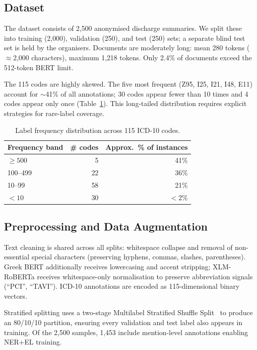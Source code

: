 \subsection{Dataset}

The dataset consists of 2,500 anonymised discharge summaries. We split these into
training (2,000), validation (250), and test (250) sets; a separate blind test set is
held by the organisers. Documents are moderately long: mean 280 tokens ($\approx$2,000 characters),
maximum 1,218 tokens. Only 2.4\% of documents exceed the 512-token BERT limit.

The 115 codes are highly skewed. The five most frequent (Z95, I25, I21, I48, E11)
account for $\sim$41\% of all annotations; 30 codes appear fewer than 10 times and 4
codes appear only once (Table~\ref{tab:label_stats}). This long-tailed distribution
requires explicit strategies for rare-label coverage.

\begin{table}[ht]
\centering
\caption{Label frequency distribution across 115 ICD-10 codes.}
\label{tab:label_stats}
\begin{tabular}{lrr}
\toprule
Frequency band & \# codes & Approx.\ \% of instances \\
\midrule
$\geq 500$  & 5  & 41\% \\
100--499    & 22 & 36\% \\
10--99      & 58 & 21\% \\
$< 10$      & 30 & $<$2\% \\
\bottomrule
\end{tabular}
\end{table}

\subsection{Preprocessing and Data Augmentation}

Text cleaning is shared across all splits: whitespace collapse and removal of non-essential
special characters (preserving hyphens, commas, slashes, parentheses). Greek BERT
additionally receives lowercasing and accent stripping; XLM-RoBERTa receives
whitespace-only normalisation to preserve abbreviation signals (``PCI'', ``TAVI'').
ICD-10 annotations are encoded as 115-dimensional binary vectors.

Stratified splitting uses a two-stage Multilabel Stratified Shuffle Split~\cite{sechidis2011stratification}
to produce an 80/10/10 partition, ensuring every validation and test label also appears
in training. Of the 2,500 samples, 1,453 include mention-level annotations enabling
NER+EL training.

